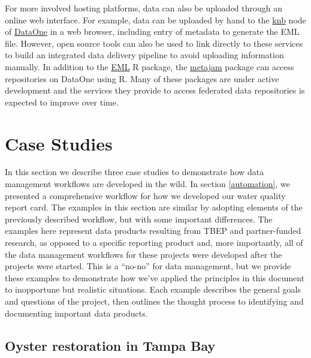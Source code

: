 \documentclass[
]{book}
\begin{document}
For more involved hosting platforms, data can also be uploaded through an online web interface. For example, data can be uploaded by hand to the \href{https://knb.ecoinformatics.org/}{knb} node of \href{https://www.dataone.org/}{DataOne} in a web browser, including entry of metadata to generate the EML file. However, open source tools can also be used to link directly to these services to build an integrated data delivery pipeline to avoid uploading information manually. In addition to the \href{https://docs.ropensci.org/EML/}{EML} R package, the \href{https://nceas.github.io/metajam/}{metajam} package can access repositories on DataOne using R. Many of these packages are under active development and the services they provide to access federated data repositories is expected to improve over time.

\hypertarget{cases}{%
\chapter{Case Studies}\label{cases}}

In this section we describe three case studies to demonstrate how data management workflows are developed in the wild. In section \ref{automation}, we presented a comprehensive workflow for how we developed our water quality report card. The examples in this section are similar by adopting elements of the previously described workflow, but with some important differences. The examples here represent data products resulting from TBEP and partner-funded research, as opposed to a specific reporting product and, more importantly, all of the data management workflows for these projects were developed after the projects were started. This is a ``no-no'' for data management, but we provide these examples to demonstrate how we've applied the principles in this document to inopportune but realistic situations. Each example describes the general goals and questions of the project, then outlines the thought process to identifying and documenting important data products.

\hypertarget{oyster}{%
\section{Oyster restoration in Tampa Bay}\label{oyster}}
\end{document}
